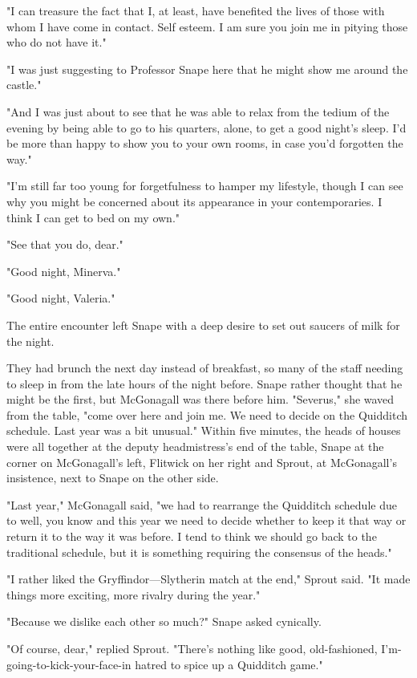 "I can treasure the fact that I, at least, have benefited the lives of those with whom I have come in contact. Self esteem. I am sure you join me in pitying those who do not have it."

"I was just suggesting to Professor Snape here that he might show me around the castle."

"And I was just about to see that he was able to relax from the tedium of the evening by being able to go to his quarters, alone, to get a good night's sleep. I'd be more than happy to show you to your own rooms, in case you'd forgotten the way."

"I'm still far too young for forgetfulness to hamper my lifestyle, though I can see why you might be concerned about its appearance in your contemporaries. I think I can{\el} get to bed on my own."

"See that you do, dear."

"Good night, Minerva."

"Good night, Valeria."

The entire encounter left Snape with a deep desire to set out saucers of milk for the night.

They had brunch the next day instead of breakfast, so many of the staff needing to sleep in from the late hours of the night before. Snape rather thought that he might be the first, but McGonagall was there before him. "Severus," she waved from the table, "come over here and join me. We need to decide on the Quidditch schedule. Last year was a bit unusual." Within five minutes, the heads of houses were all together at the deputy headmistress's end of the table, Snape at the corner on McGonagall's left, Flitwick on her right and Sprout, at McGonagall's insistence, next to Snape on the other side.

"Last year," McGonagall said, "we had to rearrange the Quidditch schedule due to{\el} well, you know{\el} and this year we need to decide whether to keep it that way or return it to the way it was before. I tend to think we should go back to the traditional schedule, but it is something requiring the consensus of the heads."

"I rather liked the Gryffindor—Slytherin match at the end," Sprout said. "It made things more exciting, more rivalry during the year."

"Because we dislike each other so much?" Snape asked cynically.

"Of course, dear," replied Sprout. "There's nothing like good, old-fashioned, I'm-going-to-kick-your-face-in hatred to spice up a Quidditch game."

